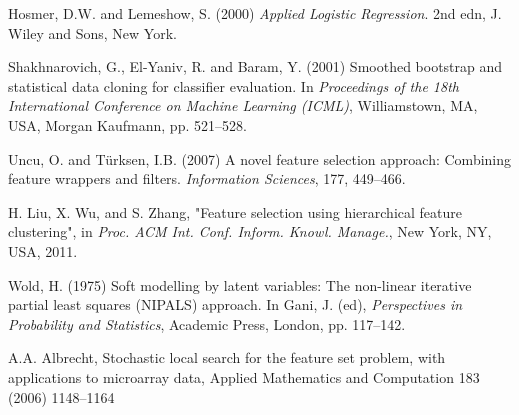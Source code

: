 \documentclass[a4paper,11pt]{article}
\begin{document}

\begin{thebibliography}{}

Hosmer, D.W. and Lemeshow, S. (2000) \textit{Applied Logistic Regression}. 2nd edn, J. Wiley and Sons, New York.

Shakhnarovich, G., El-Yaniv, R. and Baram, Y. (2001) Smoothed bootstrap and statistical data cloning for classifier
evaluation. In \textit{Proceedings of the 18th International Conference on Machine Learning (ICML)}, Williamstown, MA, USA, Morgan Kaufmann, pp.
521--528.

Uncu, O. and T\"urksen, I.B. (2007) A novel feature selection
approach: Combining feature wrappers and filters. \textit{Information Sciences}, 177, 449--466.

H. Liu, X. Wu, and S. Zhang, "Feature selection using hierarchical feature clustering", in \textit{Proc. ACM Int. Conf. Inform. Knowl. Manage.}, New York, NY, USA, 2011.

 Wold, H. (1975) Soft modelling by latent variables: The non-linear iterative partial least squares ({NIPALS})
approach. In Gani, J. (ed), \textit{Perspectives in Probability and Statistics}, Academic Press, London, pp. 117--142.

A.A. Albrecht, Stochastic local search for the feature set problem, with applications to microarray data, Applied Mathematics and Computation 183 (2006) 1148–1164

\end{thebibliography}
\end{document}
